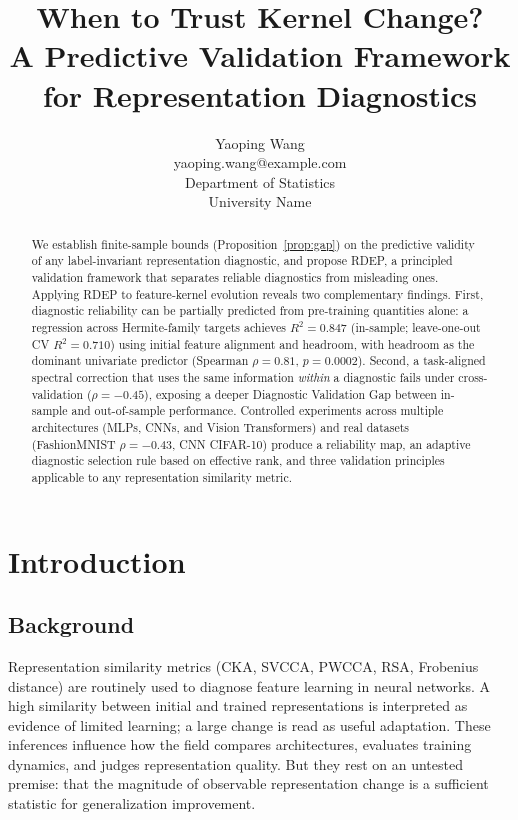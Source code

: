 \documentclass[10pt]{article}
\title{When to Trust Kernel Change?\\A Predictive Validation Framework for Representation Diagnostics}
\author{
  \name Yaoping Wang \\
  \email yaoping.wang@example.com \\
  \addr Department of Statistics \\
  \addr University Name
}
\begin{document}
\maketitle

\begin{abstract}
We establish finite-sample bounds (Proposition~\ref{prop:gap}) on the predictive validity of any label-invariant representation diagnostic, and propose RDEP, a principled validation framework that separates reliable diagnostics from misleading ones. Applying RDEP to feature-kernel evolution reveals two complementary findings. First, diagnostic reliability can be partially predicted from pre-training quantities alone: a regression across Hermite-family targets achieves $R^2=0.847$ (in-sample; leave-one-out CV $R^2=0.710$) using initial feature alignment and headroom, with headroom as the dominant univariate predictor (Spearman $\rho=0.81$, $p=0.0002$). Second, a task-aligned spectral correction that uses the same information \emph{within} a diagnostic fails under cross-validation ($\rho=-0.45$), exposing a deeper Diagnostic Validation Gap between in-sample and out-of-sample performance. Controlled experiments across multiple architectures (MLPs, CNNs, and Vision Transformers) and real datasets (FashionMNIST $\rho=-0.43$, CNN CIFAR-10) produce a reliability map, an adaptive diagnostic selection rule based on effective rank, and three validation principles applicable to any representation similarity metric.
\end{abstract}

\section{Introduction}
\label{sec:intro}

\subsection{Background}

Representation similarity metrics (CKA, SVCCA, PWCCA, RSA, Frobenius distance) are routinely used to diagnose feature learning in neural networks. A high similarity between initial and trained representations is interpreted as evidence of limited learning; a large change is read as useful adaptation. These inferences influence how the field compares architectures, evaluates training dynamics, and judges representation quality. But they rest on an untested premise: that the magnitude of observable representation change is a sufficient statistic for generalization improvement.
\end{document}
